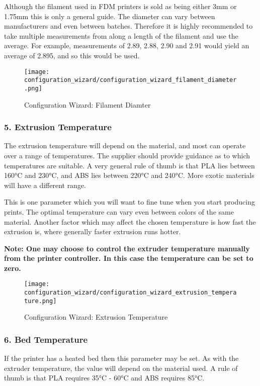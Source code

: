 Although the filament used in FDM printers is sold as being either 3mm or 1.75mm this is only a general guide.  The diameter can vary between manufacturers and even between batches.  Therefore it is highly recommended to take multiple measurements from along a length of the filament and use the average.  For example, measurements of 2.89, 2.88, 2.90 and 2.91 would yield an average of 2.895, and so this would be used.

\begin{figure}[H]
\centering
\texttt{[image: configuration\_wizard/configuration\_wizard\_filament\_diameter.png]}
\caption{Configuration Wizard: Filament Diamter}
\label{fig:configuration_wizard_filament_diameter}
\end{figure}

\newpage
\subsubsection{5. Extrusion Temperature}
\label{sub:5_extrusion_temperature}
The extrusion temperature will depend on the material, and most can operate over a range of temperatures.  The supplier should provide guidance as to which temperatures are suitable.  A very general rule of thumb is that PLA lies between 160°C and 230°C, and ABS lies between 220°C and 240°C. More exotic materials will have a different range.

This is one parameter which you will want to fine tune when you start producing prints.  The optimal temperature can vary even between colors of the same material.  Another factor which may affect the chosen temperature is how fast the extrusion is, where generally faster extrusion runs hotter.

\textbf{Note: One may choose to control the extruder temperature manually from the printer controller. In this case the temperature can be set to zero.}

\begin{figure}[H]
\centering
\texttt{[image: configuration\_wizard/configuration\_wizard\_extrusion\_temperature.png]}
\caption{Configuration Wizard: Extrusion Temperature}
\label{fig:configuration_wizard_extrusion_temperature}
\end{figure}

\newpage
\subsubsection{6. Bed Temperature}
\label{sub:6_bed_temperature}
If the printer has a heated bed then this parameter may be set.  As with the extruder temperature, the value will depend on the material used.  A rule of thumb is that PLA requires 35°C - 60°C and ABS requires 85°C.

